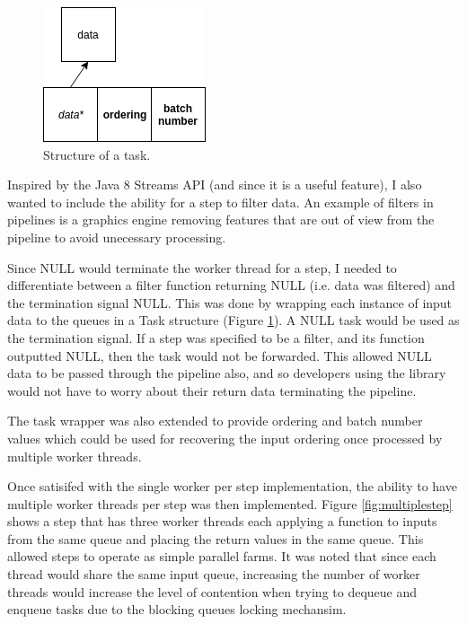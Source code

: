\documentclass[12pt]{article}
\begin{document}
\begin{figure}[!ht]
	\centering 
	\includegraphics[width=0.45\linewidth]{images/task}
	\caption{Structure of a task.}
	\label{fig:task}
\end{figure}

Inspired by the Java 8 Streams API (and since it is a useful feature), I also wanted to include the ability for a step to filter data. An example of filters in pipelines is a graphics engine removing features that are out of view from the pipeline to avoid unecessary processing. 

Since NULL would terminate the worker thread for a step, I needed to differentiate between a filter function returning NULL (i.e. data was filtered) and the termination signal NULL. This was done by wrapping each instance of input data to the queues in a Task structure (Figure \ref{fig:task}). A NULL task would be used as the termination signal. If a step was specified to be a filter, and its function outputted NULL, then the task would not be forwarded. This allowed NULL data to be passed through the pipeline also, and so developers using the library would not have to worry about their return data terminating the pipeline.

The task wrapper was also extended to provide ordering and batch number values which could be used for recovering the input ordering once processed by multiple worker threads. 

Once satisifed with the single worker per step implementation, the ability to have multiple worker threads per step was then implemented. Figure \ref{fig:multiplestep} shows a step that has three worker threads each applying a function to inputs from the same queue and placing the return values in the same queue. This allowed steps to operate as simple parallel farms. It was noted that since each thread would share the same input queue, increasing the number of worker threads would increase the level of contention when trying to dequeue and enqueue tasks due to the blocking queues locking mechansim. 
\end{document}
